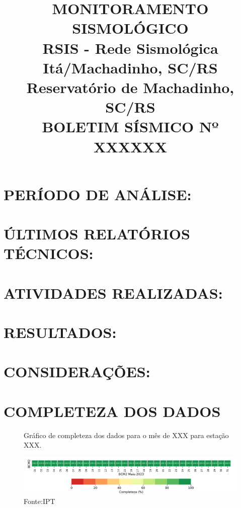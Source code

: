 \documentclass[12]{iptex}
\begin{document}
\thispagestyle{plain} %
\title{\textbf{MONITORAMENTO SISMOLÓGICO} \\
\textbf{RSIS - Rede Sismológica Itá/Machadinho, SC/RS} \\
\textbf{Reservatório de Machadinho, SC/RS} \\
\textbf{BOLETIM SÍSMICO Nº XXXXXX}}
\maketitle

\section{PERÍODO DE ANÁLISE:}

\section{ÚLTIMOS RELATÓRIOS TÉCNICOS:}

\section{ATIVIDADES REALIZADAS:}

\section{RESULTADOS:}

\section{CONSIDERAÇÕES:}

\newpage
\titleformat{\section}[hang]{\bfseries\Large}{\thesection}{1em}{} %
\section{COMPLETEZA DOS DADOS}
\begin{figure}[h]
    \centering
    \caption{Gráfico de completeza dos dados para o mês de XXX para estação XXX.}
    \includegraphics[width=1.0\textwidth]{../figuras/completeza_dos_dados.png} %
    \caption*{Fonte:IPT}
\end{figure}
\end{document}
